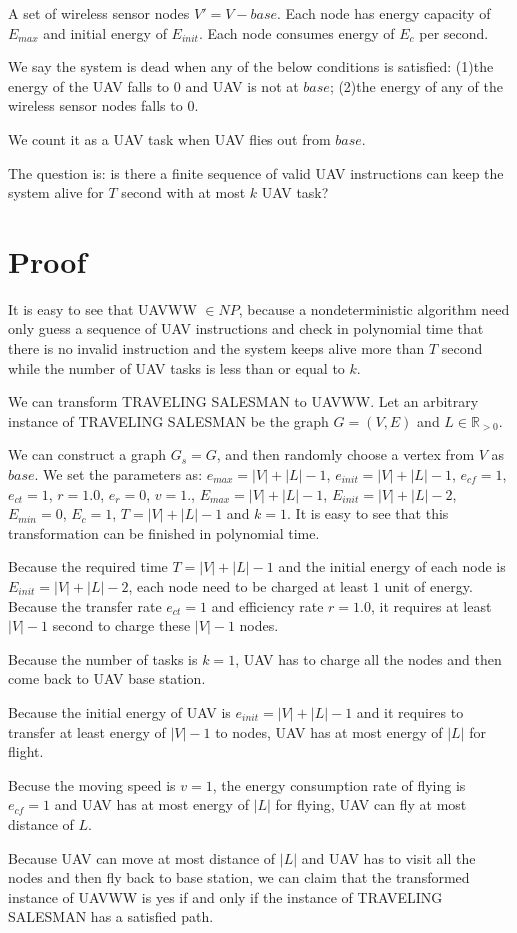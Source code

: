 \documentclass[11pt]{article}
\begin{document}
A set of wireless sensor nodes $V' = V - {base}$. Each node has energy capacity of $E_{max}$ and initial energy of $E_{init}$. Each node consumes energy of $E_{c}$ per second.

We say the system is dead when any of the below conditions is satisfied:
(1)the energy of the UAV falls to 0 and UAV is not at $base$;
(2)the energy of any of the wireless sensor nodes falls to 0.

We count it as a UAV task when UAV flies out from $base$.

The question is: is there a finite sequence of valid UAV instructions can keep the system alive for $T$ second with at most $k$ UAV task?

\section{Proof}
It is easy to see that UAVWW $\in NP$, because a nondeterministic algorithm need only guess a sequence of UAV instructions and check in polynomial time that there is no invalid instruction and the system keeps alive more than $T$ second while the number of UAV tasks is less than or equal to $k$.

We can transform TRAVELING SALESMAN to UAVWW. Let an arbitrary instance of TRAVELING SALESMAN be the graph $G = (V, E)$ and $L \in \mathbb{R}_{>0}$.

We can construct a graph $G_s = G$, and then randomly choose a vertex from $V$ as $base$. We set the parameters as: $e_{max} = |V| + |L| - 1$, $e_{init} = |V| + |L| - 1$, $e_{cf} = 1$, $e_{ct} = 1$, $r = 1.0$, $e_r = 0$, $v = 1$., $E_{max} = |V| + |L| - 1$, $E_{init} = |V| + |L| - 2$, $E_{min} = 0$, $E_{c} = 1$, $T = |V| + |L| - 1$ and $k = 1$. It is easy to see that this transformation can be finished in polynomial time.

Because the required time $T = |V| + |L| - 1$ and the initial energy of each node is $E_{init} = |V| + |L| - 2$, each node need to be charged at least $1$ unit of energy. Because the transfer rate $e_{ct} = 1$ and efficiency rate $r = 1.0$, it requires at least $|V| - 1$ second to charge these $|V| - 1$ nodes.

Because the number of tasks is $k = 1$, UAV has to charge all the nodes and then come back to UAV base station.

Because the initial energy of UAV is $e_{init} = |V| + |L| - 1$ and it requires to transfer at least energy of $|V| - 1$ to nodes, UAV has at most energy of $|L|$ for flight. 

Becuse the moving speed is $v = 1$, the energy consumption rate of flying is  $e_{cf} = 1$ and UAV has at most energy of $|L|$ for flying, UAV can fly at most distance of $L$.

Because UAV can move at most distance of $|L|$ and UAV has to visit all the nodes and then fly back to base station, we can claim that the transformed instance of UAVWW is yes if and only if the instance of TRAVELING SALESMAN has a satisfied path.
\end{document}
